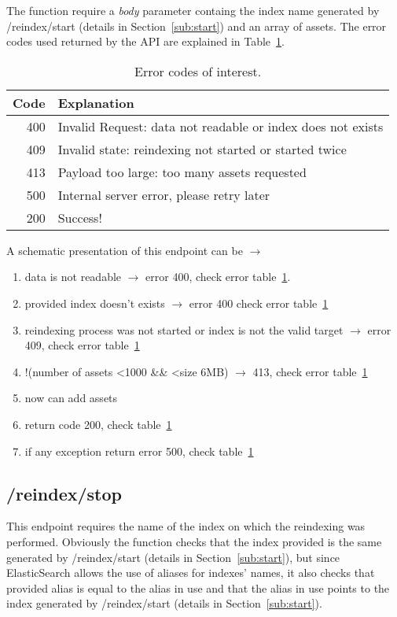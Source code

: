 The function require a \textit{body} parameter containg the index name
generated by /reindex/start (details in Section~\ref{sub:start}) and
an array of assets.  The error codes used returned by the API are
explained in Table~\ref{tab:error-codes}.
\begin{table}[t]
  \centering
  \begin{tabular}{rl}
    \hline
    Code & Explanation \\
    \hline
    400 & Invalid Request: data not readable or index does not exists \\
    409 & Invalid state: reindexing not started or started twice \\
    413 & Payload too large: too many assets requested \\
    500 & Internal server error, please retry later \\
    200 & Success! \\
    \hline
  \end{tabular}
  \caption{Error codes of interest.}
  \label{tab:error-codes}
\end{table}
A schematic presentation of this endpoint can be $\rightarrow$
\begin{enumerate}
    \item data is not readable  $\rightarrow$ error 400, check error table~\ref{tab:error-codes}.
    \item provided index doesn't exists  $\rightarrow$ error 400 check error table~\ref{tab:error-codes} 
    \item reindexing process was not started or index is not the valid target  $\rightarrow$  error 409, check error table~\ref{tab:error-codes}
    \item  !(number of assets  \textless 1000 \&\& \textless size 6MB) $\rightarrow$ 413, check error table~\ref{tab:error-codes}
    \item now can add assets 
    \item return code 200, check table~\ref{tab:error-codes}
    \item if any exception return error 500, check table~\ref{tab:error-codes}
    
\end{enumerate}

\subsection{/reindex/stop}
\label{sub:stop}
This endpoint requires the name of the index on which the reindexing was performed.
Obviously the function checks that the index provided is the same generated by /reindex/start (details in Section~\ref{sub:start}),
but since ElasticSearch allows the use of aliases for indexes' names, it also checks that 
provided alias is equal to the alias in use and that the alias in use points to the index
generated by /reindex/start (details in Section~\ref{sub:start}).

